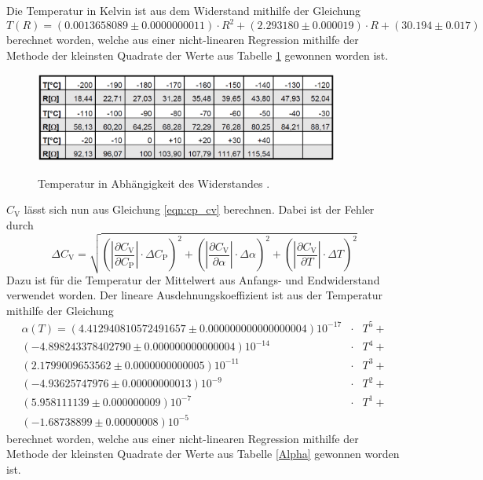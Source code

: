 Die Temperatur in Kelvin ist aus dem Widerstand mithilfe der Gleichung
\begin{equation*}
	T(R) = (0.0013658089 \pm 0.0000000011) \cdot R^2 + (2.293180 \pm 0.000019) \cdot R + (30.194 \pm 0.017)
\end{equation*}
berechnet worden, welche aus einer nicht-linearen Regression mithilfe der Methode der kleinsten Quadrate der Werte aus Tabelle \ref{Temperatur} gewonnen worden ist.

\begin{figure}[!h]
	\centering
	\caption[]{Temperatur in Abhängigkeit des Widerstandes \cite{V47}.}
	\includegraphics[width = 10cm]{img/temperatur.png}	
	\label{Temperatur}
\end{figure}

$C_\mathrm{V}$ lässt sich nun aus Gleichung \eqref{eqn:cp_cv} 
berechnen.
Dabei ist der Fehler durch
\begin{equation*}
	\Delta C_\mathrm{V} = \sqrt{\left(|\frac{\partial C_\mathrm{V}}{\partial C_\mathrm{P}}|\cdot \Delta C_\mathrm{P} \right)^2 + \left(|\frac{\partial C_\mathrm{V}}{\partial \alpha}|\cdot \Delta \alpha \right)^2 + \left(|\frac{\partial C_\mathrm{V}}{\partial T}|\cdot \Delta T \right)^2}
\end{equation*}
Dazu ist für die Temperatur der Mittelwert aus Anfangs- und Endwiderstand verwendet worden.
Der lineare Ausdehnungskoeffizient ist aus der Temperatur mithilfe der Gleichung
\begin{eqnarray*}
	\alpha(T) = 
	(4.412940810572491657\pm0.000000000000000004)10^{-17} &\cdot& T^5 +\\
	(-4.898243378402790\pm0.000000000000004)10^{-14} &\cdot& T^4 + \\
	(2.1799009653562\pm0.0000000000005)10^{-11} &\cdot& T^3 + \\
	(-4.93625747976\pm0.00000000013)10^{-9} &\cdot& T^2 + \\
	(5.958111139\pm0.000000009)10^{-7} &\cdot& T^1 + \\
	(-1.68738899\pm0.00000008)10^{-5} &&
\end{eqnarray*}
berechnet worden, welche aus einer nicht-linearen Regression mithilfe der Methode der kleinsten Quadrate der Werte aus Tabelle \ref{Alpha} gewonnen worden ist.

